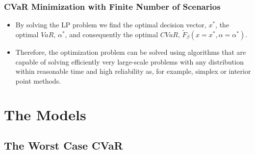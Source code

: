 \documentclass[pdf,10pt,xcolor=dvipsnames,hide notes]{beamer}
\begin{document}
\begin{frame}[label=frame2b9]
	\frametitle{CVaR Minimization with Finite Number of Scenarios}
	
	\begin{itemize}
		\justifying
		
		\item By solving the LP problem we
		find the optimal decision vector, $x^{\ast }$, the optimal $VaR$, $\alpha
		^{\ast }$, and consequently the optimal $CVaR$, $\widetilde{F}_{\beta
		}\left( x=x^{\ast },\alpha=\alpha ^{\ast }\right) $.
	
	\vspace{0.3cm}
	
	\item Therefore, the optimization problem can be solved using algorithms that are
	capable of solving efficiently very large-scale problems with any
	distribution within reasonable time and high reliability as, for example,
	simplex or interior point methods.
	
		
	\end{itemize}
	
\end{frame}

\section{The Models}
\subsection{The Worst Case CVaR}
\end{document}
